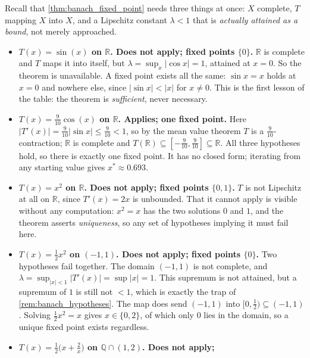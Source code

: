 \begin{exercisesolution}
\label{sol:bfpt_applicability_table}
Recall that \cref{thm:banach_fixed_point} needs three things at once: $X$ complete, $T$ mapping
$X$ into $X$, and a Lipschitz constant $\lambda < 1$ that is \emph{actually attained as a bound},
not merely approached.
\begin{itemize}
  \item \textbf{$T(x) = \sin(x)$ on $\mathbb{R}$. Does not apply; fixed points $\{0\}$.}
    $\mathbb{R}$ is complete and $T$ maps it into itself, but
    $\lambda = \sup_{x}\lvert\cos x\rvert = 1$, attained at $x=0$. So the theorem is unavailable.
    A fixed point exists all the same: $\sin x = x$ holds at $x=0$ and nowhere else, since
    $\lvert\sin x\rvert < \lvert x\rvert$ for $x \neq 0$. This is the first lesson of the table:
    the theorem is \emph{sufficient}, never necessary.
  \item \textbf{$T(x) = \tfrac{9}{10}\cos(x)$ on $\mathbb{R}$. Applies; one fixed point.}
    Here $\lvert T'(x)\rvert = \tfrac{9}{10}\lvert\sin x\rvert \leq \tfrac{9}{10} < 1$, so by the
    mean value theorem $T$ is a $\tfrac{9}{10}$-contraction; $\mathbb{R}$ is complete and
    $T(\mathbb{R}) \subseteq [-\tfrac9{10},\tfrac9{10}] \subseteq \mathbb{R}$. All three
    hypotheses hold, so there is exactly one fixed point. It has no closed form; iterating from
    any starting value gives $x^* \approx 0.693$.
  \item \textbf{$T(x) = x^2$ on $\mathbb{R}$. Does not apply; fixed points $\{0,1\}$.}
    $T$ is not Lipschitz at all on $\mathbb{R}$, since $T'(x) = 2x$ is unbounded. That it cannot
    apply is visible without any computation: $x^2 = x$ has the two solutions $0$ and $1$, and
    the theorem asserts \emph{uniqueness}, so any set of hypotheses implying it must fail here.
  \item \textbf{$T(x) = \tfrac12x^2$ on $(-1,1)$. Does not apply; fixed points $\{0\}$.}
    Two hypotheses fail together. The domain $(-1,1)$ is not complete, and
    $\lambda = \sup_{\lvert x\rvert<1}\lvert T'(x)\rvert = \sup\lvert x\rvert = 1$. This supremum
    is not attained, but a supremum of $1$ is still not $<1$, which is exactly the trap of
    \cref{rem:banach_hypotheses}. The map does send $(-1,1)$ into $[0,\tfrac12) \subseteq
    (-1,1)$. Solving $\tfrac12x^2 = x$ gives $x \in \{0,2\}$, of which only $0$ lies in the
    domain, so a unique fixed point exists regardless.
  \item \textbf{$T(x) = \tfrac12\big(x+\tfrac2x\big)$ on $\mathbb{Q}\cap(1,2)$. Does not apply;
}
\end{itemize}
\end{exercisesolution}
